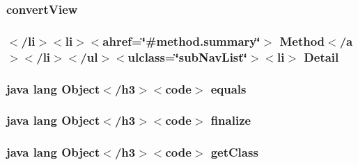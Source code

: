 \hypertarget{_stations_list_adapter_8html_a074c9ae2abe97703c9c031be7f3eb2e5}{
\subsubsection[{convert\-View}]{\setlength{\rightskip}{0pt plus 5cm}convert\-View}}\label{_stations_list_adapter_8html_a074c9ae2abe97703c9c031be7f3eb2e5}
\hypertarget{_stations_list_adapter_8html_a1e04b5ec07bcd5281e26dcd40e5b3a94}{
\subsubsection[{Detail}]{\setlength{\rightskip}{0pt plus 5cm}$<$/li$>$$<$li$>$$<$ahref=\char`\"{}\#method.\-summary\char`\"{}$>$ Method$<$/{\bf a}$>$$<$/li$>$$<$/ul$>$$<$ulclass=\char`\"{}sub\-Nav\-List\char`\"{}$>$$<$li$>$ Detail}}\label{_stations_list_adapter_8html_a1e04b5ec07bcd5281e26dcd40e5b3a94}
\hypertarget{_stations_list_adapter_8html_a8974318cea585f72df717e0380ec7104}{
\subsubsection[{equals}]{\setlength{\rightskip}{0pt plus 5cm}java lang Object$<$/h3$>$$<$code$>$ equals}}\label{_stations_list_adapter_8html_a8974318cea585f72df717e0380ec7104}
\hypertarget{_stations_list_adapter_8html_ab2315181ead4aeedef2374039b6ddde7}{
\subsubsection[{finalize}]{\setlength{\rightskip}{0pt plus 5cm}java lang Object$<$/h3$>$$<$code$>$ finalize}}\label{_stations_list_adapter_8html_ab2315181ead4aeedef2374039b6ddde7}
\hypertarget{_stations_list_adapter_8html_a98e6644727fe65eac217a6855045be43}{
\subsubsection[{get\-Class}]{\setlength{\rightskip}{0pt plus 5cm}java lang Object$<$/h3$>$$<$code$>$ get\-Class}}\label{_stations_list_adapter_8html_a98e6644727fe65eac217a6855045be43}

